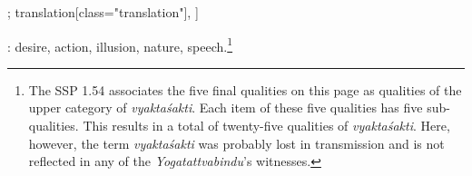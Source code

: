 \begin{alignment}[
  texts=edition[class="edition"];
  translation[class="translation"],
  ]
\begin{translation}
\begin{tlate}
: desire, action, illusion, nature, speech.\footnote{The SSP 1.54 associates the five final qualities on this page as qualities of the upper category of \textit{vyaktaśakti}. Each item of these five qualities has five sub-qualities. This results in a total of twenty-five qualities of \textit{vyaktaśakti}. Here, however, the term \textit{vyaktaśakti} was probably lost in transmission and is not reflected in any of the \textit{Yogatattvabindu}'s witnesses.}
    \end{tlate}
  \end{translation}
\end{alignment}
\pagebreak %
